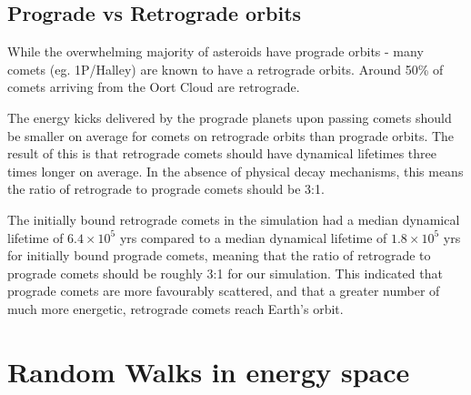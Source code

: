 \subsection{Prograde vs Retrograde orbits}

While the overwhelming majority of asteroids have prograde orbits - many comets (eg. 1P/Halley) are known to have a retrograde orbits. Around 50\% of comets arriving from the Oort Cloud are retrograde.

The energy kicks delivered by the prograde planets upon passing comets should be smaller on average for comets on retrograde orbits than prograde orbits. The result of this is that retrograde comets should have dynamical lifetimes three times longer on average. In the absence of physical decay mechanisms, this means the ratio of retrograde to prograde comets should be 3:1.%

The initially bound retrograde comets in the simulation had a median dynamical lifetime of $6.4\times10^5$ yrs compared to a median dynamical lifetime of $1.8\times10^5$ yrs for initially bound prograde comets, meaning that the ratio of retrograde to prograde comets should be roughly 3:1 for our simulation. This indicated that prograde comets are more favourably scattered, and that a greater number of much more energetic, retrograde comets reach Earth's orbit.


\section{Random Walks in energy space}

